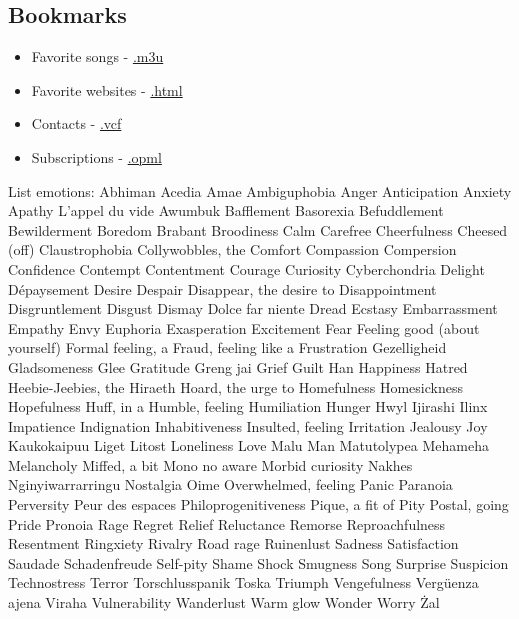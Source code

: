 \documentclass[a4paper]{article}
\begin{document}
\begin{itemize}
\subsection{Bookmarks}
\begin{itemize}
	\item Favorite songs - \href{BuJo-Addons/rainwave_all_mp3.m3u}{.m3u} 
	\item Favorite websites - \href{BuJo-Addons/hotlist.html}{.html}
	\item Contacts - \href{BuJo-Addons/john-doe.vcf}{.vcf}
	\item Subscriptions - \href{BuJo-Addons/feeds.opml}{.opml}
    \end{itemize}
	\newpage
List emotions:
	 Abhiman
	 Acedia
	 Amae
	 Ambiguphobia
	 Anger
	 Anticipation
	 Anxiety
	 Apathy
	 L’appel du vide
	 Awumbuk
	 Bafflement
	 Basorexia
	 Befuddlement
	 Bewilderment
	 Boredom
	 Brabant
	 Broodiness
	 Calm
	 Carefree
	 Cheerfulness
	 Cheesed (off)
	 Claustrophobia
	 Collywobbles, the
	 Comfort
	 Compassion
	 Compersion
	 Confidence
	 Contempt
	 Contentment
	 Courage
	 Curiosity
	 Cyberchondria
	 Delight
	 Dépaysement
	 Desire
	 Despair
	 Disappear, the desire to
	 Disappointment
	 Disgruntlement
	 Disgust
	 Dismay
	 Dolce far niente
	 Dread
	 Ecstasy
	 Embarrassment
	 Empathy
	 Envy
	 Euphoria
	 Exasperation
	 Excitement
	 Fear
	 Feeling good (about yourself)
	 Formal feeling, a
	 Fraud, feeling like a
	 Frustration
	 Gezelligheid
	 Gladsomeness
	 Glee
	 Gratitude
	 Greng jai
	 Grief
	 Guilt
	 Han
	 Happiness
	 Hatred
	 Heebie-Jeebies, the
	 Hiraeth
	 Hoard, the urge to
	 Homefulness
	 Homesickness
	 Hopefulness
	 Huff, in a
	 Humble, feeling
	 Humiliation
	 Hunger
	 Hwyl
	 Ijirashi
	 Ilinx
	 Impatience
	 Indignation
	 Inhabitiveness
	 Insulted, feeling
	 Irritation
	 Jealousy
	 Joy
	 Kaukokaipuu
	 Liget
	 Litost
	 Loneliness
	 Love
	 Malu
	 Man
	 Matutolypea
	 Mehameha
	 Melancholy
	 Miffed, a bit
	 Mono no aware
	 Morbid curiosity
	 Nakhes
	 Nginyiwarrarringu
	 Nostalgia
	 Oime
	 Overwhelmed, feeling
	 Panic
	 Paranoia
	 Perversity
	 Peur des espaces
	 Philoprogenitiveness
	 Pique, a fit of
	 Pity
	 Postal, going
	 Pride
	 Pronoia
	 Rage
	 Regret
	 Relief
	 Reluctance
	 Remorse
	 Reproachfulness
	 Resentment
	 Ringxiety
	 Rivalry
	 Road rage
	 Ruinenlust
	 Sadness
	 Satisfaction
	 Saudade
	 Schadenfreude
   Self-pity
	 Shame
	 Shock
	 Smugness
	 Song
	 Surprise
	 Suspicion
	 Technostress
	 Terror
	 Torschlusspanik
	 Toska
	 Triumph
	 Vengefulness
	 Vergüenza ajena
	 Viraha
	 Vulnerability
	 Wanderlust
 	 Warm glow
	 Wonder
	 Worry
	 Żal
\newpage

\end{itemize}
\end{document}
